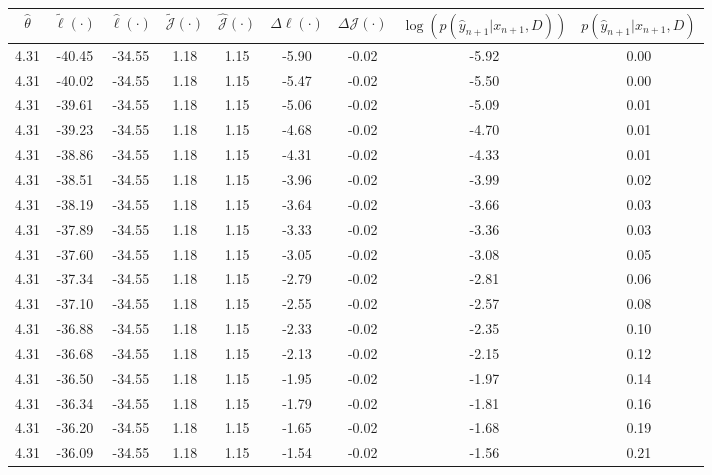 \begin{table}[htbp]
        \centering
        \tiny
        \begin{adjustbox}{angle=90}
            \begin{tabular}{|c|c|c|c|c|c|c|c|c|}
                \hline
                 $\hat{\theta}$ & $\tilde{\ell}(\cdot)$ & $\hat{\ell}(\cdot)$ & $\tilde{\mathcal{J}}(\cdot)$ & $\hat{\mathcal{J}}(\cdot)$ & $\Delta \ell(\cdot)$ & $\Delta \mathcal{J}(\cdot)$ & $\log(p(\hat{y}_{n+1}|x_{n+1}, D))$ & $p(\hat{y}_{n+1}|x_{n+1}, D)$ \\
                \hline
                 4.31 & -40.45 & -34.55 & 1.18 & 1.15 & -5.90 & -0.02 & -5.92 & 0.00\\ \hline
 4.31 & -40.02 & -34.55 & 1.18 & 1.15 & -5.47 & -0.02 & -5.50 & 0.00\\ \hline
 4.31 & -39.61 & -34.55 & 1.18 & 1.15 & -5.06 & -0.02 & -5.09 & 0.01\\ \hline
 4.31 & -39.23 & -34.55 & 1.18 & 1.15 & -4.68 & -0.02 & -4.70 & 0.01\\ \hline
 4.31 & -38.86 & -34.55 & 1.18 & 1.15 & -4.31 & -0.02 & -4.33 & 0.01\\ \hline
 4.31 & -38.51 & -34.55 & 1.18 & 1.15 & -3.96 & -0.02 & -3.99 & 0.02\\ \hline
 4.31 & -38.19 & -34.55 & 1.18 & 1.15 & -3.64 & -0.02 & -3.66 & 0.03\\ \hline
 4.31 & -37.89 & -34.55 & 1.18 & 1.15 & -3.33 & -0.02 & -3.36 & 0.03\\ \hline
 4.31 & -37.60 & -34.55 & 1.18 & 1.15 & -3.05 & -0.02 & -3.08 & 0.05\\ \hline
 4.31 & -37.34 & -34.55 & 1.18 & 1.15 & -2.79 & -0.02 & -2.81 & 0.06\\ \hline
 4.31 & -37.10 & -34.55 & 1.18 & 1.15 & -2.55 & -0.02 & -2.57 & 0.08\\ \hline
 4.31 & -36.88 & -34.55 & 1.18 & 1.15 & -2.33 & -0.02 & -2.35 & 0.10\\ \hline
 4.31 & -36.68 & -34.55 & 1.18 & 1.15 & -2.13 & -0.02 & -2.15 & 0.12\\ \hline
 4.31 & -36.50 & -34.55 & 1.18 & 1.15 & -1.95 & -0.02 & -1.97 & 0.14\\ \hline
 4.31 & -36.34 & -34.55 & 1.18 & 1.15 & -1.79 & -0.02 & -1.81 & 0.16\\ \hline
 4.31 & -36.20 & -34.55 & 1.18 & 1.15 & -1.65 & -0.02 & -1.68 & 0.19\\ \hline
 4.31 & -36.09 & -34.55 & 1.18 & 1.15 & -1.54 & -0.02 & -1.56 & 0.21\\ \hline

\end{tabular}
\end{adjustbox}
\end{table}
